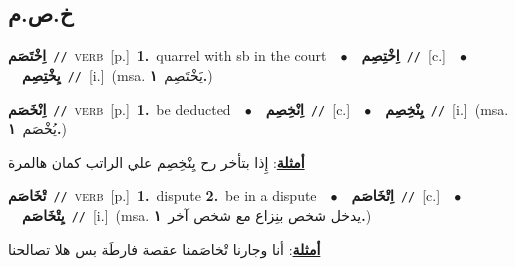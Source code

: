 \documentclass[10pt,a4paper,twoside]{article} %
\begin{document}
\begin{multicols}{2}
\vspace{-3mm}
\subsection*{\color{blue}\foreignlanguage{arabic}{خ.ص.م}\color{blue}{}} 

{\setlength\topsep{0pt}\textbf{\foreignlanguage{arabic}{اِخْتَصَم}}\ {\color{gray}\texttt{//}\color{black}}\ \textsc{verb}\ [p.]\ \textbf{1.}~quarrel with sb in the court\ \ $\bullet$\ \ \setlength\topsep{0pt}\textbf{\foreignlanguage{arabic}{اِخْتِصِم}}\ {\color{gray}\texttt{//}\color{black}}\ [c.]\ \ $\bullet$\ \ \setlength\topsep{0pt}\textbf{\foreignlanguage{arabic}{يِخْتِصِم}}\ {\color{gray}\texttt{//}\color{black}}\ [i.]\ \color{gray}(msa. \foreignlanguage{arabic}{يَخْتَصِم}~\foreignlanguage{arabic}{\textbf{١.}})\color{black}\ } \vspace{2mm}

{\setlength\topsep{0pt}\textbf{\foreignlanguage{arabic}{اِنْخَصَم}}\ {\color{gray}\texttt{//}\color{black}}\ \textsc{verb}\ [p.]\ \textbf{1.}~be deducted\ \ $\bullet$\ \ \setlength\topsep{0pt}\textbf{\foreignlanguage{arabic}{اِنْخِصِم}}\ {\color{gray}\texttt{//}\color{black}}\ [c.]\ \ $\bullet$\ \ \setlength\topsep{0pt}\textbf{\foreignlanguage{arabic}{يِنْخِصِم}}\ {\color{gray}\texttt{//}\color{black}}\ [i.]\ \color{gray}(msa. \foreignlanguage{arabic}{يُخْصَم}~\foreignlanguage{arabic}{\textbf{١.}})\color{black}\  \begin{flushright}\color{gray}\foreignlanguage{arabic}{\textbf{\underline{\foreignlanguage{arabic}{أمثلة}}}: إِذا بتأخر رح يِنْخِصِم علي الراتب كمان هالمرة}\end{flushright}\color{black}} \vspace{2mm}

{\setlength\topsep{0pt}\textbf{\foreignlanguage{arabic}{تْخَاصَم}}\ {\color{gray}\texttt{//}\color{black}}\ \textsc{verb}\ [p.]\ \textbf{1.}~dispute  \textbf{2.}~be in a dispute\ \ $\bullet$\ \ \setlength\topsep{0pt}\textbf{\foreignlanguage{arabic}{اِتْخَاصَم}}\ {\color{gray}\texttt{//}\color{black}}\ [c.]\ \ $\bullet$\ \ \setlength\topsep{0pt}\textbf{\foreignlanguage{arabic}{يِتْخَاصَم}}\ {\color{gray}\texttt{//}\color{black}}\ [i.]\ \color{gray}(msa. \foreignlanguage{arabic}{يدخل شخص بنِزاع مع شخص آخر}~\foreignlanguage{arabic}{\textbf{١.}})\color{black}\  \begin{flushright}\color{gray}\foreignlanguage{arabic}{\textbf{\underline{\foreignlanguage{arabic}{أمثلة}}}: أنا وجارنا تْخاصَمنا عقصة فارطَة بس هلا تصالحنا}\end{flushright}\color{black}} \vspace{2mm}


\end{multicols}
\end{document}
